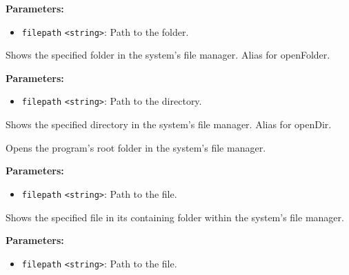 \documentclass[12pt,a4paper]{article}
\begin{document}
\noindent \textbf{Parameters:}
\begin{itemize}
  \item \texttt{filepath} \texttt{<string>}: Path to the folder.
\end{itemize}

\noindent Shows the specified folder in the system's file manager. Alias for \textasciigrave{}openFolder\textasciigrave{}.

\vspace{5mm}
\noindent {}


\noindent \textbf{Parameters:}
\begin{itemize}
  \item \texttt{filepath} \texttt{<string>}: Path to the directory.
\end{itemize}

\noindent Shows the specified directory in the system's file manager. Alias for \textasciigrave{}openDir\textasciigrave{}.

\vspace{5mm}
\noindent {}


\noindent Opens the program's root folder in the system's file manager.

\vspace{5mm}
\noindent {}


\noindent \textbf{Parameters:}
\begin{itemize}
  \item \texttt{filepath} \texttt{<string>}: Path to the file.
\end{itemize}

\noindent Shows the specified file in its containing folder within the system's file manager.

\vspace{5mm}
\noindent {}


\noindent \textbf{Parameters:}
\begin{itemize}
  \item \texttt{filepath} \texttt{<string>}: Path to the file.
\end{itemize}
\end{document}

